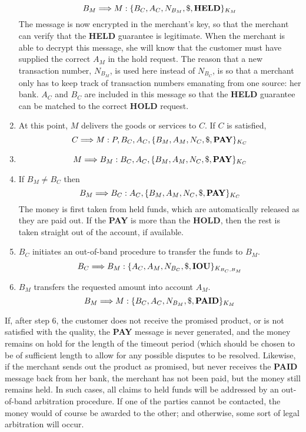 \begin{enumerate}
\[ B_{M} \Longrightarrow M : \{B_{C}, A_{C}, N_{B_{M}}, \$,  {\bf HELD} \}_{K_{M}} \]
The message is now encrypted in the merchant's key, so that the
merchant can verify that the {\bf HELD} guarantee is legitimate.  When the
merchant is able to decrypt this message, she will know that the customer
must have supplied the correct $A_{M}$ in the hold request.  The reason
that a new transaction number, $N_{B_{M}}$, is used here instead of
$N_{B_{C}}$, is so that a merchant only has to keep track of
transaction numbers emanating from one source: her bank.  $A_{C}$ and
$B_{C}$ are included in this message so that the {\bf HELD} guarantee can
be matched to the correct {\bf HOLD} request.

\item At this point, $M$ delivers the goods or services to $C$.  If $C$ is satisfied,
\[  C \Longrightarrow M : P, B_{C}, A_{C}, \{B_{M}, A_{M}, N_{C},
			 \$, {\bf PAY}\}_{K_{C}} \]

\item \[ M \Longrightarrow B_{M} : B_{C}, A_{C}, \{B_{M}, A_{M}, N_{C},
		\$, {\bf PAY}\}_{K_{C}} \]

\item If $B_{M} \neq B_{C}$ then
\[ B_{M} \Longrightarrow B_{C} : A_{C}, \{B_{M}, A_{M}, N_{C},  \$,
		{\bf PAY}\}_{K_{C}} \]
The money is first taken from held funds, which are automatically released
as they are paid out.  If the {\bf PAY} is more than the {\bf HOLD},
then the rest is taken straight out of the account, if available.

\item $B_{C}$ initiates an out-of-band procedure to transfer the funds to $B_{M}$.
\[B_{C} \Longrightarrow B_{M} : \{A_{C}, A_{M}, N_{B_{C}}, \$,  {\bf IOU}
			\}_{K_{B_{C},B_{M}}} \]

\item $B_{M}$ transfers the requested amount into account $A_{M}$.
\[ B_{M} \Longrightarrow M : \{B_{C}, A_{C}, N_{B_{M}}, \$,  {\bf PAID} \}_{K_{M}} \]

\end{enumerate}
\bigskip

If, after step 6, the customer does not receive the promised product, or is
not satisfied with the quality, the {\bf PAY} message is never generated, and
the money remains on hold for the length of the timeout period (which
should be chosen to be of sufficient length to allow for any possible
disputes to be resolved. Likewise, if the merchant sends out the product
as promised, but never receives the {\bf PAID} message back from her bank, the
merchant has not been paid, but the money still remains held.  In such
cases, all claims to held funds will be addressed by an out-of-band
arbitration procedure.  If one of the parties cannot be contacted, the money
would of course be awarded to the other; and otherwise, some sort of legal
arbitration will occur.

